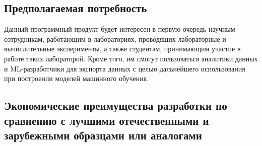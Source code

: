 \documentclass[a4paper,12pt,reqno]{article}
\begin{document}
    \subsection{Предполагаемая потребность}
    Данный программный продукт будет интересен в первую очередь научным сотрудникам, работающим в лабораториях, проводящих лабораторные и вычислительные эксперименты, а также студентам, принимающим участие в работе таких лабораторий. Кроме того, им смогут пользоваться аналитики данных и ML-разработчики для экспорта данных с целью дальнейшего использования при построении моделей машинного обучения.

    \subsection{Экономические преимущества разработки по сравнению с лучшими отечественными и зарубежными образцами или аналогами}
\end{document}
